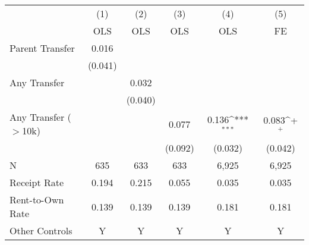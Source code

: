 {
\def\sym#1{\ifmmode^{#1}\else\(^{#1}\)\fi}
\begin{tabular}{l*{5}{c}}
\toprule
                &\multicolumn{1}{c}{(1)}&\multicolumn{1}{c}{(2)}&\multicolumn{1}{c}{(3)}&\multicolumn{1}{c}{(4)}&\multicolumn{1}{c}{(5)}\\
                &\multicolumn{1}{c}{OLS}&\multicolumn{1}{c}{OLS}&\multicolumn{1}{c}{OLS}&\multicolumn{1}{c}{OLS}&\multicolumn{1}{c}{FE}\\
\midrule
\;Parent Transfer&    0.016         &                  &                  &                  &                  \\
                &  (0.041)         &                  &                  &                  &                  \\
\;Any Transfer  &                  &    0.032         &                  &                  &                  \\
                &                  &  (0.040)         &                  &                  &                  \\
\;Any Transfer ($>$10k)&                  &                  &    0.077         &    0.136\sym{***}&    0.083\sym{+}  \\
                &                  &                  &  (0.092)         &  (0.032)         &  (0.042)         \\
\midrule
N               &      635         &      633         &      633         &    6,925         &    6,925         \\
Receipt Rate    &    0.194         &    0.215         &    0.055         &    0.035         &    0.035         \\
Rent-to-Own Rate&    0.139         &    0.139         &    0.139         &    0.181         &    0.181         \\
Other Controls  &        Y         &        Y         &        Y         &        Y         &        Y         \\
\bottomrule
\end{tabular}
}
